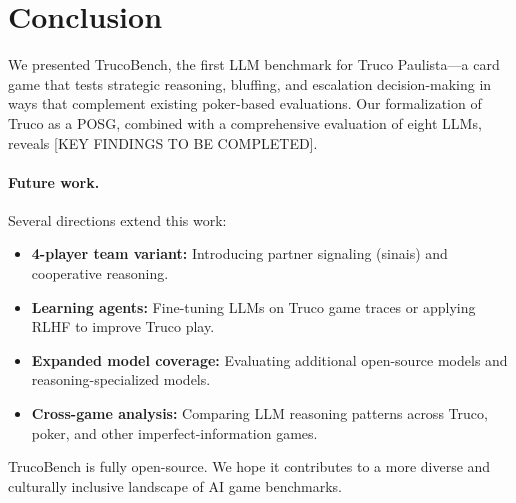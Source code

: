 \section{Conclusion}

We presented TrucoBench, the first LLM benchmark for Truco Paulista---a card game that tests strategic reasoning, bluffing, and escalation decision-making in ways that complement existing poker-based evaluations. Our formalization of Truco as a POSG, combined with a comprehensive evaluation of eight LLMs, reveals [KEY FINDINGS TO BE COMPLETED].

\paragraph{Future work.} Several directions extend this work:
\begin{itemize}
    \item \textbf{4-player team variant:} Introducing partner signaling (sinais) and cooperative reasoning.
    \item \textbf{Learning agents:} Fine-tuning LLMs on Truco game traces or applying RLHF to improve Truco play.
    \item \textbf{Expanded model coverage:} Evaluating additional open-source models and reasoning-specialized models.
    \item \textbf{Cross-game analysis:} Comparing LLM reasoning patterns across Truco, poker, and other imperfect-information games.
\end{itemize}

TrucoBench is fully open-source. We hope it contributes to a more diverse and culturally inclusive landscape of AI game benchmarks.
